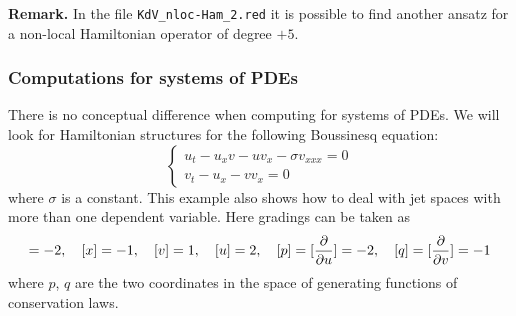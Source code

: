 \textbf{Remark.} In the file \texttt{KdV\_nloc-Ham\_2.red} it is possible to
find another ansatz for a non-local Hamiltonian operator of degree $+5$.

\subsubsection{Computations for systems of PDEs}
\label{sec:comp-syst-pdes}

There is no conceptual difference when computing for systems of PDEs. We will
look for Hamiltonian structures for the following Boussinesq equation:
\begin{equation}
  \label{eq:1}
  \left\{
  \begin{array}{l}
  u_t-u_xv-uv_x-\sigma v_{xxx}=0\\
  v_t-u_x-vv_x=0
\end{array}
\right.
\end{equation}
where $\sigma$ is a constant. This example also shows how to deal with jet
spaces with more than one dependent variable. Here gradings can be taken as
\begin{displaymath}
  [t]=-2,\quad [x]=-1,\quad [v]=1,\quad [u]=2,\quad [p]=[\pd{}{u}]=-2,\quad
  [q]=[\pd{}{v}]=-1
\end{displaymath}
where $p$, $q$ are the two coordinates in the space of generating functions of
conservation laws.

